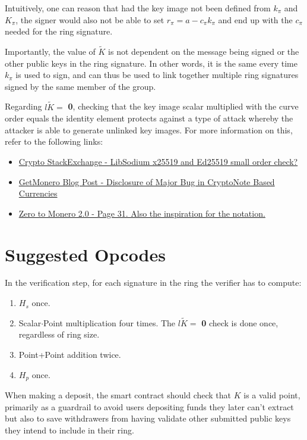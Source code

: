 \documentclass[9pt]{article}
\begin{document}
Intuitively, one can reason that had the key image not been defined from $k_\pi$ and $K_\pi$, the signer would also not be able to set $r_\pi = a - c_\pi k_\pi$ and end up with the $c_\pi$ needed for the ring signature.

Importantly, the value of $\tilde{K}$ is not dependent on the message being signed or the other public keys in the ring signature. In other words, it is the same every time $k_\pi$ is used to sign, and can thus be used to link together multiple ring signatures signed by the same member of the group.

Regarding $l\tilde{K} =$ \textbf{0}, checking that the key image scalar multiplied with the curve order equals the identity element protects against a type of attack whereby the attacker is able to generate unlinked key images. 
For more information on this, refer to the following links: 

\begin{itemize}
    \item \href{https://crypto.stackexchange.com/questions/55632/libsodium-x25519-and-ed25519-small-order-check}{Crypto StackExchange - LibSodium x25519 and Ed25519 small order check?}
    \item \href{https://web.getmonero.org/2017/05/17/disclosure-of-a-major-bug-in-cryptonote-based-currencies.html}{GetMonero Blog Post - Disclosure of Major Bug in CryptoNote Based Currencies}
    \item \href{https://web.getmonero.org/library/Zero-to-Monero-2-0-0.pdf}{Zero to Monero 2.0 - Page 31. Also the inspiration for the notation.}
\end{itemize}


\section{Suggested Opcodes}

In the verification step, for each signature in the ring the verifier has to compute:
\begin{enumerate}
    \item $H_s$ once.
    \item Scalar$\cdot$Point multiplication four times. The $l\tilde{K} =$ \textbf{0} check is done once, regardless of ring size.    
    \item Point+Point addition twice.
    \item $H_p$ once.
\end{enumerate}

When making a deposit, the smart contract should check that $K$ is a valid point, primarily as a guardrail to avoid users depositing funds they later can't extract but also to save withdrawers from having validate other submitted public keys they intend to include in their ring.
\end{document}
